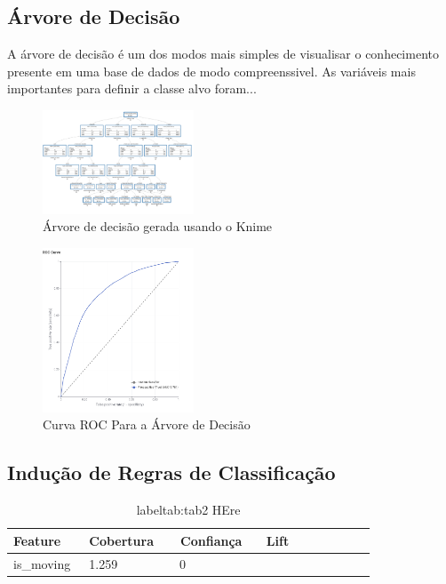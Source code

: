 \documentclass[conference]{IEEEtran}
\begin{document}
\subsection{Árvore de Decisão}

A árvore de decisão é um dos modos mais simples de visualisar o conhecimento presente em uma 
base de dados de modo compreenssivel. As variáveis mais importantes para definir a classe alvo foram...
\begin{figure}[H]
\centerline{\includegraphics[width=0.4\textwidth]{Images/decision-tree.png}}
\caption{\label{fig:decision-tree} Árvore de decisão gerada usando o Knime}
\end{figure}

\begin{figure}[H]
    \centerline{\includegraphics[width=0.4\textwidth]{Images/roc-curve-decision-tree.png}}
    \caption{\label{fig:decision-tree} Curva ROC Para a Árvore de Decisão}
\end{figure}


\subsection{Indução de Regras de Classificação}

\begin{table}[!ht]
    \centering
    \begin{tabular}{|l|l|l|l|l|l|l|l|l|l|}
    \hline
        Feature~ & Cobertura~ & ~Confiança & ~ Lift \\ \hline
        is\_moving~ &  1.259~ & ~0 & ~  \\ \hline
    \end{tabular}
    \caption{label{tab:tab2} HEre}
\end{table}
\end{document}
